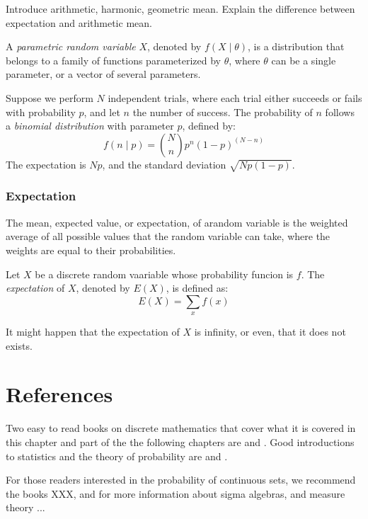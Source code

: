 {\color{red} Introduce arithmetic, harmonic, geometric mean. Explain the difference between expectation and arithmetic mean.}

A \emph{parametric random variable} $X$, denoted by $f\left(X \mid \theta \right)$, is a distribution that belongs to a family of functions parameterized by $\theta$, where $\theta$ can be a single parameter, or a vector of several parameters.  

\begin{example}

Suppose we perform $N$ independent trials, where each trial either succeeds or fails with probability $p$, and let $n$ the number of success. The probability of $n$ follows a \emph{binomial distribution} with parameter $p$, defined by:
\[
f(n\mid p) = \binom{N}{n} p^n (1-p)^{(N-n)}
\]
The expectation is $Np$, and the standard deviation $\sqrt{Np(1-p)}$.

\end{example}


\subsubsection{Expectation}

The mean, expected value, or expectation, of arandom variable is the weighted average of all possible values that the random variable can take, where the weights are equal to their probabilities.

\begin{definition}
Let $X$ be a discrete random vaariable whose probability funcion is $f$. The \emph{expectation} of $X$, denoted by $E(X)$, is defined as:
\[
E(X) = \sum_x f(x)
\]
\end{definition}

It might happen that the expectation of $X$ is infinity, or even, that it does not exists.


\section*{References}

Two easy to read books on discrete mathematics that cover what it is covered in this chapter and part of the the following chapters are \cite{rosen1995discrete} and \cite{epp2010discrete}. Good introductions to statistics and the theory of probability are \cite{degroot1986probability} and \cite{spiegel2012probability}.

{\color{red} For those readers interested in the probability of continuous sets, we recommend the books XXX, and for more information about sigma algebras, and measure theory ...}
